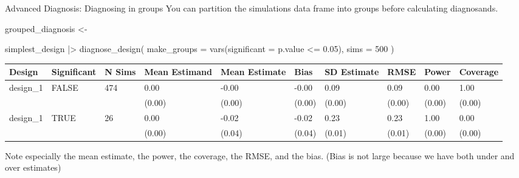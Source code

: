 \documentclass[
  11pt,
  ignorenonframetext,
]{beamer}
\newenvironment{Shaded}{\begin{snugshade}}{\end{snugshade}}
\newcommand{\AttributeTok}[1]{\textcolor[rgb]{0.40,0.45,0.13}{#1}}
\newcommand{\DecValTok}[1]{\textcolor[rgb]{0.68,0.00,0.00}{#1}}
\newcommand{\FloatTok}[1]{\textcolor[rgb]{0.68,0.00,0.00}{#1}}
\newcommand{\FunctionTok}[1]{\textcolor[rgb]{0.28,0.35,0.67}{#1}}
\newcommand{\NormalTok}[1]{\textcolor[rgb]{0.00,0.23,0.31}{#1}}
\newcommand{\OtherTok}[1]{\textcolor[rgb]{0.00,0.23,0.31}{#1}}
\newcommand{\SpecialCharTok}[1]{\textcolor[rgb]{0.37,0.37,0.37}{#1}}
\begin{document}
\begin{frame}[fragile]{Advanced Diagnosis: Diagnosing in groups}
\protect\hypertarget{advanced-diagnosis-diagnosing-in-groups}{}
You can partition the simulations data frame into groups before
calculating diagnosands.

\begin{Shaded}
\begin{Highlighting}[]
\NormalTok{grouped\_diagnosis }\OtherTok{\textless{}{-}} 
  
\NormalTok{  simplest\_design }\SpecialCharTok{|\textgreater{}}
  \FunctionTok{diagnose\_design}\NormalTok{(}
    \AttributeTok{make\_groups =} \FunctionTok{vars}\NormalTok{(}\AttributeTok{significant =}\NormalTok{ p.value }\SpecialCharTok{\textless{}=} \FloatTok{0.05}\NormalTok{),}
    \AttributeTok{sims =} \DecValTok{500}
\NormalTok{  )}
\end{Highlighting}
\end{Shaded}

\begin{tabular}{l|l|l|l|l|l|l|l|l|l}
\hline
Design & Significant & N Sims & Mean Estimand & Mean Estimate & Bias & SD Estimate & RMSE & Power & Coverage\\
\hline
design\_1 & FALSE & 474 & 0.00 & -0.00 & -0.00 & 0.09 & 0.09 & 0.00 & 1.00\\
\hline
 &  &  & (0.00) & (0.00) & (0.00) & (0.00) & (0.00) & (0.00) & (0.00)\\
\hline
design\_1 & TRUE & 26 & 0.00 & -0.02 & -0.02 & 0.23 & 0.23 & 1.00 & 0.00\\
\hline
 &  &  & (0.00) & (0.04) & (0.04) & (0.01) & (0.01) & (0.00) & (0.00)\\
\hline
\end{tabular}

Note especially the mean estimate, the power, the coverage, the RMSE,
and the bias. (Bias is not large because we have both under and over
estimates)
\end{frame}
\end{document}
